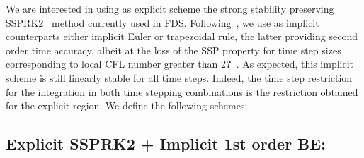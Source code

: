 We are interested in using as explicit scheme the strong stability preserving SSPRK2~\cite{Gottlieb:2001} method currently used in FDS.
Following~\cite{May:2014}, we use as implicit counterparts either implicit Euler or trapezoidal rule, the latter providing second order time accuracy, albeit at the loss of the SSP property for time step sizes corresponding to local CFL number greater than 2\textbf{?}~\cite{Ketcheson:2009,Gottlieb:2009}. As expected, this implicit scheme is still linearly stable for all time steps. Indeed, the time step restriction for the integration in both time stepping combinations is the restriction obtained for the explicit region.
We define the following schemes:

\subsection*{Explicit SSPRK2 + Implicit 1st order BE:}

